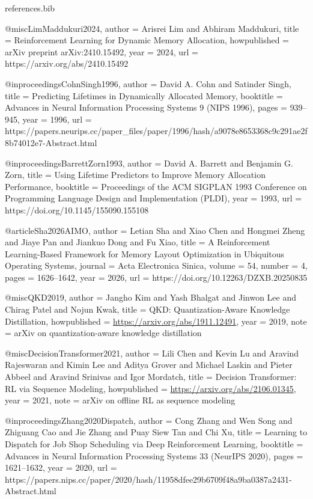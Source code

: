 \begin{filecontents*}{references.bib}

@misc{LimMaddukuri2024,
  author       = {Arisrei Lim and Abhiram Maddukuri},
  title        = {Reinforcement Learning for Dynamic Memory Allocation},
  howpublished = {arXiv preprint arXiv:2410.15492},
  year         = {2024},
  url          = {https://arxiv.org/abs/2410.15492}
}

@inproceedings{CohnSingh1996,
  author    = {David A. Cohn and Satinder Singh},
  title     = {Predicting Lifetimes in Dynamically Allocated Memory},
  booktitle = {Advances in Neural Information Processing Systems 9 (NIPS 1996)},
  pages     = {939--945},
  year      = {1996},
  url       = {https://papers.neurips.cc/paper_files/paper/1996/hash/a9078e8653368c9c291ae2f8b74012e7-Abstract.html}
}

@inproceedings{BarrettZorn1993,
  author    = {David A. Barrett and Benjamin G. Zorn},
  title     = {Using Lifetime Predictors to Improve Memory Allocation Performance},
  booktitle = {Proceedings of the ACM SIGPLAN 1993 Conference on Programming Language Design and Implementation (PLDI)},
  year      = {1993},
  url       = {https://doi.org/10.1145/155090.155108}
}

@article{Sha2026AIMO,
  author  = {Letian Sha and Xiao Chen and Hongmei Zheng and Jiaye Pan and Jiankuo Dong and Fu Xiao},
  title   = {A Reinforcement Learning-Based Framework for Memory Layout Optimization in Ubiquitous Operating Systems},
  journal = {Acta Electronica Sinica},
  volume  = {54},
  number  = {4},
  pages   = {1626--1642},
  year    = {2026},
  url     = {https://doi.org/10.12263/DZXB.20250835}
}

@misc{QKD2019,
  author = {Jangho Kim and Yash Bhalgat and Jinwon Lee and Chirag Patel and Nojun Kwak},
  title = {{QKD}: Quantization-Aware Knowledge Distillation},
  howpublished = {\url{https://arxiv.org/abs/1911.12491}},
  year = {2019},
  note = {arXiv on quantization-aware knowledge distillation}
}

@misc{DecisionTransformer2021,
  author = {Lili Chen and Kevin Lu and Aravind Rajeswaran and Kimin Lee and Aditya Grover and Michael Laskin and Pieter Abbeel and Aravind Srinivas and Igor Mordatch},
  title = {Decision Transformer: {RL} via Sequence Modeling},
  howpublished = {\url{https://arxiv.org/abs/2106.01345}},
  year = {2021},
  note = {arXiv on offline RL as sequence modeling}
}

@inproceedings{Zhang2020Dispatch,
  author    = {Cong Zhang and Wen Song and Zhiguang Cao and Jie Zhang and Puay Siew Tan and Chi Xu},
  title     = {Learning to Dispatch for Job Shop Scheduling via Deep Reinforcement Learning},
  booktitle = {Advances in Neural Information Processing Systems 33 (NeurIPS 2020)},
  pages     = {1621--1632},
  year      = {2020},
  url       = {https://papers.nips.cc/paper/2020/hash/11958dfee29b6709f48a9ba0387a2431-Abstract.html}
}


\end{filecontents*}
